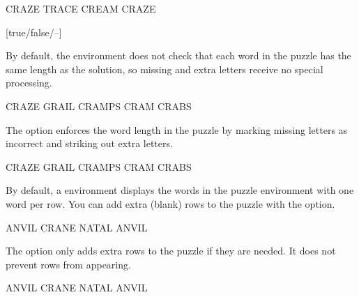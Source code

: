 \documentclass[svgnames]{report}
\begin{document}
  \begin{example}
    \begin{wordle}[noletters]{CRAZE}
      TRACE
      CREAM
      CRAZE
    \end{wordle}
  \end{example}

  [true/false/--]

  By default, the  environment does not check that each
  word in the puzzle has the same length as the solution, so missing
  and extra letters receive no special processing.

  \begin{example}
    \begin{wordle}[strict=false]{CRAZE} %
      GRAIL
      CRAMPS
      CRAM
      CRABS
    \end{wordle}
  \end{example}

  The  option enforces the word length in the puzzle by
  marking missing letters as incorrect and striking out extra letters.

  \begin{example}
    \begin{wordle}[strict]{CRAZE}
      GRAIL
      CRAMPS
      CRAM
      CRABS
    \end{wordle}
  \end{example}


  By default, a  environment displays the words
  in the puzzle environment with one word per row. You can add extra
  (blank) rows to the puzzle with the  option.

  \begin{example}
    \begin{wordle}[rows=4]{ANVIL}
      CRANE
      NATAL
      ANVIL
    \end{wordle}
  \end{example}

  The  option only adds extra rows to the puzzle if they are
  needed. It does not prevent rows from appearing.

  \begin{example}
    \begin{wordle}[rows=2]{ANVIL}
      CRANE
      NATAL
      ANVIL
    \end{wordle}
  \end{example}
\end{document}
